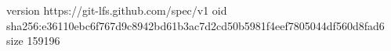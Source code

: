 version https://git-lfs.github.com/spec/v1
oid sha256:e36110ebc6f767d9c8942bd61b3ac7d2cd50b5981f4eef7805044df560d8fad6
size 159196
